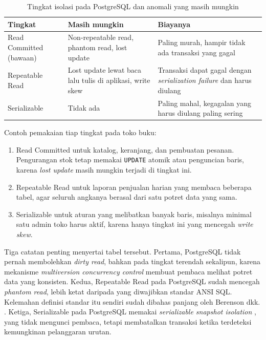 \begin{table}[!htb]
  \centering
  \caption{Tingkat isolasi pada PostgreSQL dan anomali yang masih mungkin}
  \label{tab:isolasi}
  \begin{tabularx}{\textwidth}{lXX}
    \hline
    \textbf{Tingkat} & \textbf{Masih mungkin} & \textbf{Biayanya} \\
    \hline
    Read Committed (bawaan) & Non-repeatable read, phantom read, lost update & Paling murah, hampir tidak ada transaksi yang gagal \\
    \hline
    Repeatable Read & Lost update lewat baca lalu tulis di aplikasi, write skew & Transaksi dapat gagal dengan \textit{serialization failure} dan harus diulang \\
    \hline
    Serializable & Tidak ada & Paling mahal, kegagalan yang harus diulang paling sering \\
    \hline
  \end{tabularx}
\end{table}

Contoh pemakaian tiap tingkat pada toko buku:

\begin{enumerate}
  \item Read Committed untuk katalog, keranjang, dan pembuatan pesanan.
        Pengurangan stok tetap memakai \texttt{UPDATE} atomik atau penguncian
        baris, karena \textit{lost update} masih mungkin terjadi di tingkat ini.
  \item Repeatable Read untuk laporan penjualan harian yang membaca beberapa
        tabel, agar seluruh angkanya berasal dari satu potret data yang sama.
  \item Serializable untuk aturan yang melibatkan banyak baris, misalnya
        minimal satu admin toko harus aktif, karena hanya tingkat ini yang
        mencegah \textit{write skew}.
\end{enumerate}

Tiga catatan penting menyertai tabel tersebut. Pertama, PostgreSQL tidak pernah
membolehkan \textit{dirty read}, bahkan pada tingkat terendah sekalipun, karena
mekanisme \textit{multiversion concurrency control} membuat pembaca melihat
potret data yang konsisten. Kedua, Repeatable Read pada PostgreSQL sudah
mencegah \textit{phantom read}, lebih ketat daripada yang diwajibkan standar
ANSI SQL. Kelemahan definisi standar itu sendiri sudah dibahas panjang oleh
Berenson dkk. \cite{berenson1995critique}. Ketiga, Serializable pada PostgreSQL
memakai \textit{serializable snapshot isolation} \cite{ports2012serializable},
yang tidak mengunci pembaca, tetapi membatalkan transaksi ketika terdeteksi
kemungkinan pelanggaran urutan.

